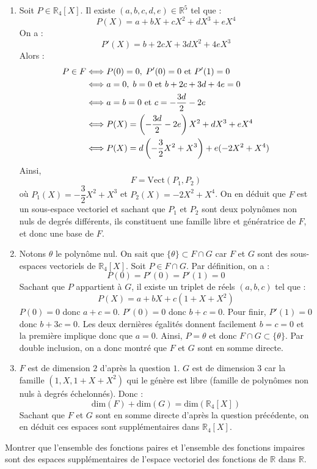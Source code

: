 \documentclass[a4paper,10pt]{report}
\begin{document}
\begin{enumerate}
\item Soit $P \in \mathbb{R}_4[X]$. Il existe $(a,b,c,d,e) \in \mathbb{R}^5$ tel que :
$$ P(X) = a+bX+cX^2+dX^3+eX^4$$
On a :
$$ P'(X) = b+2cX+3dX^2+4eX^3$$
Alors :
\begin{align*}
P \in F & \Longleftrightarrow P(0)=0, \; P'(0)=0 \hbox{ et } P'(1)=0 \\
& \Longleftrightarrow a=0, \; b=0 \hbox{ et } b+2c+3d+4e = 0 \\
& \Longleftrightarrow a=b=0 \hbox{ et } c= -\dfrac{3d}{2} - 2e \\
& \Longleftrightarrow P(X) = \left( -\dfrac{3d}{2} - 2e \right)X^2 + d X^3 + eX^4 \\
& \Longleftrightarrow P(X) = d \left( - \dfrac{3}{2}X^2+ X^3 \right) + e (-2X^2+X^4)
\end{align*}
Ainsi,
$$ F= \textrm{Vect}(P_1,P_2)$$
où $P_1(X) = - \dfrac{3}{2}X^2+ X^3$ et $P_2(X)= -2X^2+X^4$. On en déduit que $F$ est un sous-espace vectoriel et sachant que $P_1$ et $P_2$ sont deux polynômes non nuls de degrés différents, ils constituent une famille libre et génératrice de $F$, et donc une base de $F$.
\item Notons $\theta$ le polynôme nul. On sait que $\lbrace \theta \rbrace \subset F \cap G$ car $F$ et $G$ sont des sous-espaces vectoriels de $\mathbb{R}_4[X]$. Soit $P \in F \cap G$. Par définition, on a :
$$ P(0)=P'(0)=P'(1)=0$$
Sachant que $P$ appartient à $G$, il existe un triplet de réels $(a,b,c)$ tel que :
$$ P(X)= a + bX + c(1+X+X^2)$$
$P(0)=0$ donc $a+c=0$. $P'(0)=0$ donc $b+c=0$. Pour finir, $P'(1)=0$ donc $b+3c=0$. Les deux dernières égalités donnent facilement $b=c=0$ et la première implique donc que $a=0$. Ainsi, $P= \theta$ et donc $ F \cap G \subset \lbrace \theta \rbrace$. Par double inclusion, on a donc montré que $F$ et $G$ sont en somme directe.
\item $F$ est de dimension $2$ d'après la question $1$. $G$ est de dimension $3$ car la famille $(1,X,1+X+X^2)$ qui le génère est libre (famille de polynômes non nuls à degrés échelonnés). Donc :
$$ \textrm{dim}(F)+ \textrm{dim}(G) = \textrm{dim}(\mathbb{R}_4[X])$$
Sachant que $F$ et $G$ sont en somme directe d'après la question précédente, on en déduit ces espaces sont supplémentaires dans $\mathbb{R}_4[X]$.
\end{enumerate}

\medskip

\begin{Exercice}{} Montrer que l'ensemble des fonctions paires et l'ensemble des fonctions impaires sont des espaces supplémentaires de l'espace vectoriel des fonctions de $\mathbb{R}$ dans $\mathbb{R}$. 
\end{Exercice}
\end{document}
